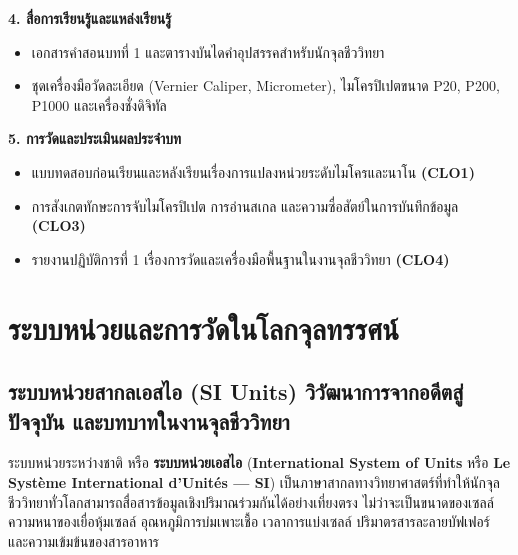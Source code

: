 \begin{planbox}
\noindent\textbf{4. สื่อการเรียนรู้และแหล่งเรียนรู้}
\begin{itemize}
    \item เอกสารคำสอนบทที่ 1 และตารางบันไดคำอุปสรรคสำหรับนักจุลชีววิทยา
    \item ชุดเครื่องมือวัดละเอียด (Vernier Caliper, Micrometer), ไมโครปิเปตขนาด P20, P200, P1000 และเครื่องชั่งดิจิทัล
\end{itemize}

\noindent\textbf{5. การวัดและประเมินผลประจำบท}
\begin{itemize}
    \item แบบทดสอบก่อนเรียนและหลังเรียนเรื่องการแปลงหน่วยระดับไมโครและนาโน \textbf{(CLO1)}
    \item การสังเกตทักษะการจับไมโครปิเปต การอ่านสเกล และความซื่อสัตย์ในการบันทึกข้อมูล \textbf{(CLO3)}
    \item รายงานปฏิบัติการที่ 1 เรื่องการวัดและเครื่องมือพื้นฐานในงานจุลชีววิทยา \textbf{(CLO4)}
\end{itemize}
\end{planbox}
\clearpage

\chapter{ระบบหน่วยและการวัดในโลกจุลทรรศน์}

\section{ระบบหน่วยสากลเอสไอ (SI Units) วิวัฒนาการจากอดีตสู่ปัจจุบัน และบทบาทในงานจุลชีววิทยา}


ระบบหน่วยระหว่างชาติ หรือ \textbf{ระบบหน่วยเอสไอ} (\textbf{International System of Units} หรือ \textbf{Le Système International d'Unités --- SI}) เป็นภาษาสากลทางวิทยาศาสตร์ที่ทำให้นักจุลชีววิทยาทั่วโลกสามารถสื่อสารข้อมูลเชิงปริมาณร่วมกันได้อย่างเที่ยงตรง ไม่ว่าจะเป็นขนาดของเซลล์ ความหนาของเยื่อหุ้มเซลล์ อุณหภูมิการบ่มเพาะเชื้อ เวลาการแบ่งเซลล์ ปริมาตรสารละลายบัฟเฟอร์ และความเข้มข้นของสารอาหาร

